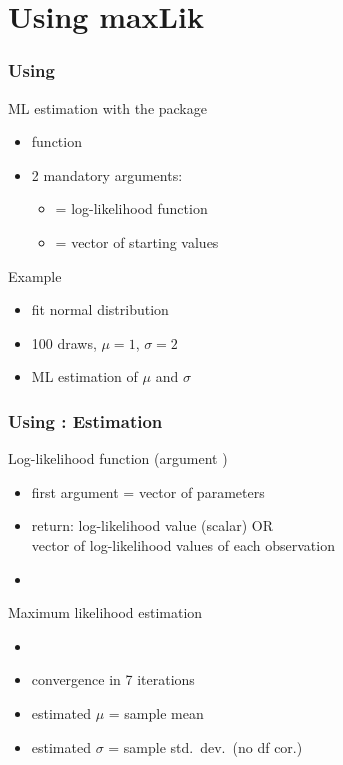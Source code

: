 \documentclass{beamer}
\begin{document}
\section{Using maxLik}
\begin{frame}
\frametitle{Using }
ML estimation with the  package
\begin{itemize}
\item function 
\item 2 mandatory arguments:
   \begin{itemize}
   \item {} = log-likelihood function
   \item {} = vector of starting values
   \end{itemize}
\end{itemize}
\vspace*{2ex}
Example
\begin{itemize}
\item fit normal distribution
\item 100 draws, $\mu = 1$, $\sigma = 2$\\
\item ML estimation of $\mu$ and $\sigma$
\end{itemize}
\end{frame}

\begin{frame}
\frametitle{Using : Estimation}
Log-likelihood function (argument )
\begin{itemize}
\item first argument = vector of parameters
\item return: log-likelihood value (scalar) OR\\
   vector of log-likelihood values of each observation
\item {}
\end{itemize}
\vspace*{2ex}
Maximum likelihood estimation
\begin{itemize}
\item {}
\item convergence in 7 iterations
\item estimated $\mu$ = sample mean
\item estimated $\sigma$ = sample std.\ dev.\ (no df cor.)
\end{itemize}
\end{frame}
\end{document}
